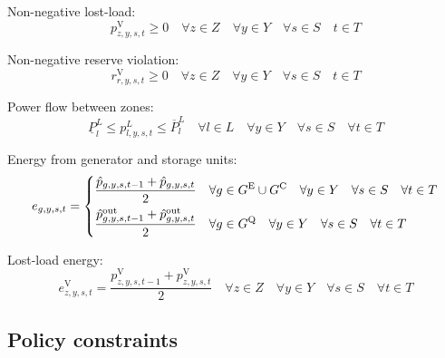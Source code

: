 \documentclass{article}
\newcommand{\sGeneratorsExisting}{G^{\mathrm{E}}}
\newcommand{\sGeneratorsCandidate}{G^{\mathrm{C}}}
\newcommand{\sStorage}{G^{\mathrm{Q}}}
\newcommand{\sYears}{Y}
\newcommand{\sScenarios}{S}
\newcommand{\sIntervals}{T}
\newcommand{\sZones}{Z}
\newcommand{\sLinks}{L}
\newcommand{\iGenerator}{g}
\newcommand{\iYear}{y}
\newcommand{\iScenario}{s}
\newcommand{\iInterval}{t}
\newcommand{\iZone}{z}
\newcommand{\iRegion}{r}
\newcommand{\iLink}{l}
\newcommand{\cPowerFlowMin}{\underline{P}_{\iLink}^{L}}
\newcommand{\cPowerFlowMax}{\overline{P}_{\iLink}^{L}}
\newcommand{\vEnergy}[1][\iGenerator,\iYear,\iScenario,\iInterval]{e_{#1}}
\newcommand{\vReserveUpViolation}[1][\iRegion,\iYear,\iScenario,\iInterval]{r^{\mathrm{V}}_{#1}}
\newcommand{\vPowerTotal}[1][\iGenerator,\iYear,\iScenario,\iInterval]{\hat{p}_{#1}}
\newcommand{\vPowerTotalOut}[1][\iGenerator,\iYear,\iScenario,\iInterval]{\hat{p}^{\mathrm{out}}_{#1}}
\newcommand{\vPowerFlow}[1][\iLink,\iYear,\iScenario,\iInterval]{p^{\sLinks}_{#1}}
\newcommand{\vLostLoadEnergy}[1][\iZone,\iYear,\iScenario,\iInterval]{e^{\mathrm{V}}_{#1}}
\newcommand{\vLostLoadPower}[1][\iZone,\iYear,\iScenario,\iInterval]{p^{\mathrm{V}}_{#1}}
\begin{document}
Non-negative lost-load:
\begin{equation}
\vLostLoadPower \geq 0 \quad \forall \iZone \in \sZones \quad \forall \iYear \in \sYears \quad \forall \iScenario \in \sScenarios \quad \iInterval \in \sIntervals
\end{equation}

Non-negative reserve violation:
\begin{equation}
\vReserveUpViolation \geq 0 \quad \forall \iZone \in \sZones \quad \forall \iYear \in \sYears \quad \forall \iScenario \in \sScenarios \quad \iInterval \in \sIntervals
\end{equation}

Power flow between zones:
\begin{equation}
\cPowerFlowMin \leq \vPowerFlow \leq \cPowerFlowMax \quad \forall \iLink \in \sLinks \quad \forall \iYear \in \sYears \quad \forall \iScenario \in \sScenarios \quad \forall \iInterval \in \sIntervals
\label{eqn: powerflow constraints}
\end{equation}

Energy from generator and storage units:
\begin{equation}
\vEnergy = \begin{dcases}
\frac{\vPowerTotal[\iGenerator, \iYear,\iScenario,\iInterval-1] + \vPowerTotal}{2} & \forall \iGenerator \in \sGeneratorsExisting \cup \sGeneratorsCandidate \quad \forall \iYear \in \sYears \quad \forall \iScenario \in \sScenarios \quad \forall \iInterval \in \sIntervals\\
\frac{\vPowerTotalOut[\iGenerator, \iYear,\iScenario,\iInterval-1] + \vPowerTotalOut}{2} & \forall \iGenerator \in \sStorage \quad \forall \iYear \in \sYears \quad \forall \iScenario \in \sScenarios \quad \forall \iInterval \in \sIntervals\\
\end{dcases}
\end{equation}

Lost-load energy:
\begin{equation}
\vLostLoadEnergy = \frac{\vLostLoadPower[\iZone, \iYear,\iScenario,\iInterval-1] + \vLostLoadPower}{2} \quad \forall \iZone \in \sZones \quad \forall \iYear \in \sYears \quad \forall \iScenario \in \sScenarios \quad \forall \iInterval \in \sIntervals
\end{equation}

\subsection{Policy constraints}
\end{document}
